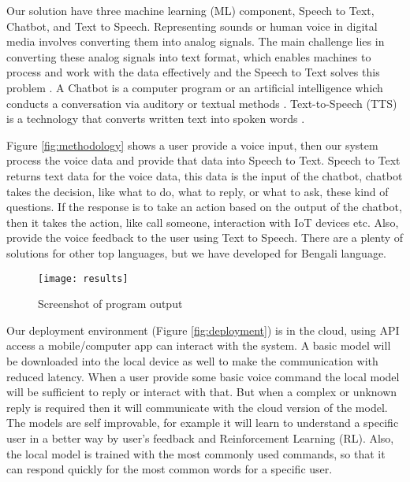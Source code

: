 Our solution have three machine learning (ML) component, Speech to Text, Chatbot, and Text to Speech.
Representing sounds or human voice in digital media involves converting them into analog signals.
The main challenge lies in converting these analog signals into text format, which enables machines to process and work with the data effectively and the Speech to Text solves this problem \cite{speech-recog-bengali}.
A Chatbot is a computer program or an artificial intelligence which conducts a conversation via auditory or textual methods \cite{chatbot}.
Text-to-Speech (TTS) is a technology that converts written text into spoken words \cite{text-to-speech}.

Figure \ref{fig:methodology} shows a user provide a voice input, then our system process the voice data and provide that data into Speech to Text.
Speech to Text returns text data for the voice data, this data is the input of the chatbot, chatbot takes the decision, like what to do, what to reply, or what to ask, these kind of questions.
If the response is to take an action based on the output of the chatbot, then it takes the action, like call someone, interaction with IoT devices etc.
Also, provide the voice feedback to the user using Text to Speech.
There are a plenty of solutions for other top languages, but we have developed for Bengali language.

\begin{figure}
    \centering
    \texttt{[image: results]}
    \caption{Screenshot of program output}\label{fig:result}
\end{figure}

Our deployment environment (Figure \ref{fig:deployment}) is in the cloud, using API access a mobile/computer app can interact with the system.
A basic model will be downloaded into the local device as well to make the communication with reduced latency.
When a user provide some basic voice command the local model will be sufficient to reply or interact with that.
But when a complex or unknown reply is required then it will communicate with the cloud version of the model.
The models are self improvable, for example it will learn to understand a specific user in a better way by user's feedback and Reinforcement Learning (RL).
Also, the local model is trained with the most commonly used commands, so that it can respond quickly for the most common words for a specific user.
